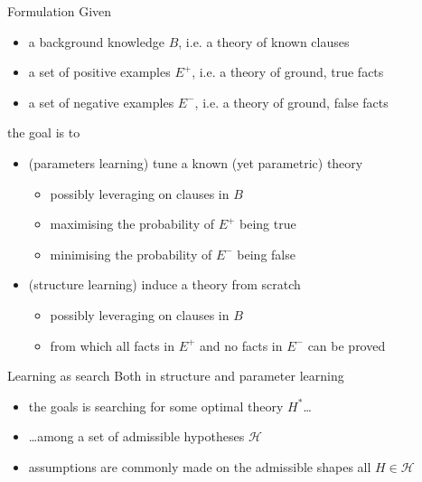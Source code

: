 \documentclass[presentation]{beamer}\mode<presentation>{\usetheme{AMSBolognaFC}}
\begin{document}
\begin{frame}[allowframebreaks]
    \begin{block}{Formulation \cite{DeRaedt2010}}
        Given
        \begin{itemize}
            \item a \alert{background knowledge} $B$, i.e. a theory of known clauses
            \item a set of \alert{positive examples} $E^+$, i.e. a theory of ground, \alert{true} facts
            \item a set of \alert{negative examples} $E^-$, i.e. a theory of ground, \alert{false} facts
        \end{itemize}
        the goal is to 
        \begin{itemize}
            \item \alert{(parameters learning)} tune a \alert{known} (yet \alert{parametric}) theory
            \begin{itemize}
                \item possibly leveraging on clauses in $B$
                \item maximising the probability of $E^+$ being true
                \item minimising the probability of $E^-$ being false
            \end{itemize}
            \item \alert{(structure learning)} induce a theory \alert{from scratch}
            \begin{itemize}
                \item possibly leveraging on clauses in $B$
                \item from which all facts in $E^+$ and no facts in $E^-$ can be proved
            \end{itemize}
        \end{itemize}
    \end{block}

    \begin{block}{Learning as search}
        Both in structure and parameter learning
        \begin{itemize}
            \item the goals is \alert{searching} for some \alert{optimal} theory $H^*$\ldots
            \item \ldots among a set of admissible hypotheses $\mathcal{H}$
            \item assumptions are commonly made on the admissible shapes all $H \in \mathcal{H}$
        \end{itemize}
    \end{block}
\end{frame}
\end{document}
